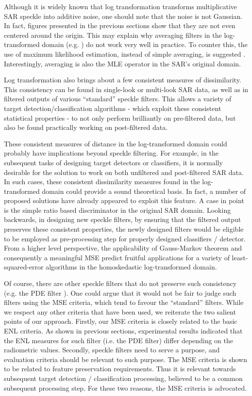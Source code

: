 \documentclass[journal]{IEEEtran}
\begin{document}
Although it is widely known that log transformation transforms multiplicative SAR speckle into additive noise, 
	one should note that the noise is not Gaussian. In fact, figures presented in the previous sections show that 
	they are not even centered around the origin. 
This may explain why averaging filters in the log-transformed domain (e.g. \cite{Arsenault_JOptSocAm_1976}) do not 
	work very well in practice.
To counter this, the use of maximum likelihood estimation, instead of simple averaging, 
	is suggested \cite{Le_2011_ACRS}. Interestingly, averaging is also the MLE operator in the SAR's original domain.

Log transformation also brings about a few consistent measures of dissimilarity.
	This consistency can be found in single-look or multi-look SAR data, 
	as well as in filtered outputs of various ``standard'' speckle filters.
This allows a variety of target detection/classification algorithms
  - which exploit these consistent statistical properties -
  to not only perform brilliantly on pre-filtered data,
  but also be found practically working on post-filtered data.
        
These consistent measures of distance in the log-transformed domain could probably have implications beyond speckle filtering.
For example, in the subsequent tasks of designing target detectors or classifiers,
  it is normally desirable for the solution to work on both unfiltered and post-filtered SAR data.
In such cases, these consistent dissimilarity measures found in the log-transformed domain could provide a sound theoretical
	basis. In fact, a number of proposed solutions have already appeared to exploit this feature. 
A case in point is the simple ratio based discriminator in the original SAR domain.
Looking backwards, in designing new speckle filters,
  by ensuring that the filtered output preserves these consistent properties,
	the newly designed filters would be eligible to be employed as pre-processing step for properly designed classifiers / detector.
From a higher level perspective, the applicability of Gauss-Markov theorem and consequently a meaningful MSE 
  predict fruitful applications for a variety of least-squared-error algorithms in the homoskedastic log-transformed domain.
        
Of course, there are other speckle filters that do not preserve such consistency 
	(e.g. the PDE filter \cite{You_TIP_2000}). One could argue that it would not be fair to judge such filters 
	using the MSE criteria, which tend to favour the ``standard'' filters.
While we respect any other criteria that have been used, we reiterate the two salient points of our approach. 
Firstly, our MSE criteria is closely related to the basic ENL criteria.
As shown in previous sections, experimental results indicated that
  the ENL measures for such filter (i.e. the PDE filter) differ depending  on the radiometric values. 
Secondly, speckle filters need to serve a purpose, and evaluation criteria should be relevant to such purpose.
The MSE criteria is shown to be related to feature preservation requirements.
Thus it is relevant towards subsequent target detection / classification processing, 
	believed to be a common subsequent processing step. 
For these two reasons, the MSE criteria is advocated.
\end{document}
